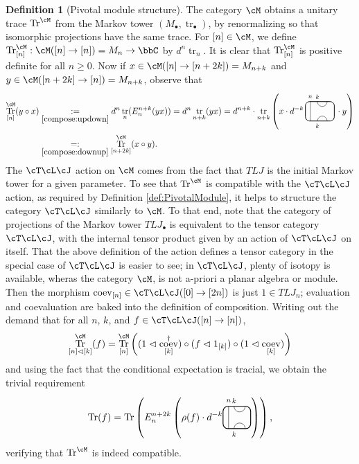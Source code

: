 \documentclass[11pt]{article}
\theoremstyle{plain}
\theoremstyle{definition}
\newtheorem{defn}[thm]{Definition}
\DeclareMathOperator{\coev}{coev}
\DeclareMathOperator{\Tr}{Tr}
\DeclareMathOperator{\tr}{tr}
\newcommand{\TLJ}{\cT\cL\cJ}
\begin{document}
\begin{defn}[Pivotal module structure] 
\label{def:PivotalModuleFromMarkovTower}
The category $\cM$ obtains a unitary trace $\Tr^\cM$ from the Markov tower $(M_\bullet,\tr_\bullet)$, by renormalizing so that isomorphic projections have the same trace.
For $[n] \in \cM$, we define $\Tr^\cM_{[n]} : \cM([n] \to [n]) = M_n \to \bbC$ by $d^n \tr_n$.
It is clear that $\Tr^\cM_{[n]}$ is positive definite for all $n\geq 0$.
Now if $x \in \cM([n] \to [n+ 2k])= M_{n+k}$ and $y\in \cM ([n+ 2k] \to [n]) = M_{n+ k}$, observe that 
\begin{align*}
\Tr^\cM_{[n]}(y\circ x)
&\underset{\ref{compose:updown}}{:=}
d^n\tr_n(E^{n+k}_n(yx))
=
d^n \tr_{n+k}(yx)
=
d^{n+k}
\cdot
\tr_{n+k}
\left(
x \cdot
d^{-k}\,
\begin{tikzpicture}[baseline = .3cm]
 \draw[thick, rounded corners = 5pt] (0,0) rectangle (1.2,.8);
 \draw (.2,0) -- (.2,.8);
 \draw (.5,.8) arc (-180:0:.2cm);
 \draw (.5,0) arc (180:0:.2cm);
 \node at (.2,1) {\scriptsize{$n$}};
 \node at (.5,1) {\scriptsize{$k$}};
 \node at (.5,-.2) {\scriptsize{$k$}};
\end{tikzpicture}\,
\cdot y
\right)
\\&\underset{\ref{compose:downup}}{=:}
\Tr^\cM_{[n+2k]}(x\circ y).
\end{align*}
 The $\TLJ$ action on $\cM$ comes from the fact that $TLJ$ is the initial Markov tower for a given parameter. %
 To see that $\Tr^\cM$ is compatible with the $\TLJ$ action, as required by Definition \ref{def:PivotalModule}, it helps to structure the category $\TLJ$ similarly to $\cM$. To that end, note that the category of projections of the Markov tower $TLJ_\bullet$ is equivalent to the tensor category $\TLJ$, with the internal tensor product given by an action of $\TLJ$ on itself. That the above definition of the action defines a tensor category in the special case of $\TLJ$ is easier to see; in $\TLJ$, plenty of isotopy is available, wheras the category $\cM$, is not a-priori a planar algebra or module. Then the morphism $\coev_{[n]}\in\TLJ([0]\to[2n])$ is just $1\in TLJ_n$; evaluation and coevaluation are baked into the definition of composition.
 Writing out the demand that for all $n$, $k$, and $f\in\TLJ([n]\to[n])$,
 \[\Tr^\cM_{[n]\vartriangleleft[k]}(f)=\Tr^\cM_{[n]}\left((1\vartriangleleft\coev_{[k]}^\dag)\circ(f\vartriangleleft1_{[k]})\circ(1\vartriangleleft\coev_{[k]})\right)\]
 and using the fact that the conditional expectation is tracial, we obtain the trivial requirement
  \[\Tr(f)=\Tr\left(E^{n+2k}_n\left(\rho(f)\cdot d^{-k}
  \begin{tikzpicture}[baseline=.3cm]
   \draw (.2,0) -- (.2,.8);
   \node at (.2,1) {\scriptsize{$n$}};
   \draw (.4,.8) arc (-180:0:.2cm);
   \node at (.4,1) {\scriptsize{$k$}};
   \draw (.4,0) arc (180:0:.2cm);
   \node at (.4,-.2) {\scriptsize{$k$}};
   \draw[thick, rounded corners = 5pt] (0,0) rectangle (1,.8);
  \end{tikzpicture}
 \right)\right)\text{,}\]
 verifying that $\Tr^\cM$ is indeed compatible.
\end{defn}
\end{document}
